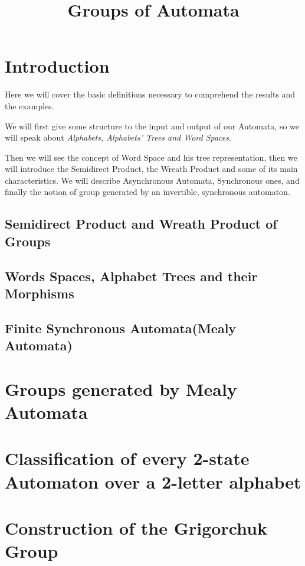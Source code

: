 \documentclass[mat1]{fmfdeloTS}
\title{Groups of Automata} %
\begin{document}


\tableofcontents

\section{Introduction}
Here we will cover the basic definitions necessary to comprehend the results and the examples.

We will first give some structure to the input and output of our Automata, so we will speak about \textit{Alphabets, Alphabets' Trees \textit{and} Word Spaces}.


Then we will see the concept of Word Space and his tree representation, then we will introduce the Semidirect Product, the Wreath Product  and some of its main characteristics. We will describe Asynchronous Automata, Synchronous ones, and finally the notion of group generated by an invertible, synchronous automaton.
\subsection{Semidirect Product and Wreath Product of Groups}
\subsection{Words Spaces, Alphabet Trees and their Morphisms}
\subsection{Finite Synchronous Automata(Mealy Automata)}


\section{Groups generated by Mealy Automata}

\section{Classification of every 2-state Automaton over a 2-letter alphabet}

\section{Construction of the Grigorchuk Group}


\bigskip
\begin{thebibliography}{99}


\end{thebibliography}
\end{document}
